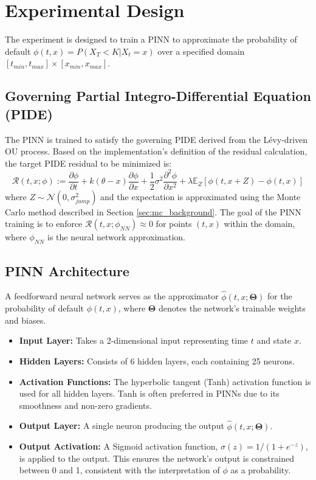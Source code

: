 \documentclass[11pt,twoside,openright]{report}
\begin{document}
\section{Experimental Design}
\label{sec:exp_design}

The experiment is designed to train a PINN to approximate the probability of default $\phi(t, x) = P(X_T < K | X_t = x)$ over a specified domain $[t_{min}, t_{max}] \times [x_{min}, x_{max}]$.

\subsection{Governing Partial Integro-Differential Equation (PIDE)}
\label{subsec:pide}

The PINN is trained to satisfy the governing PIDE derived from the Lévy-driven OU process. Based on the implementation's definition of the residual calculation, the target PIDE residual to be minimized is:
$$
\mathcal{R}(t, x; \phi) := \frac{\partial \phi}{\partial t} + k(\theta - x)\frac{\partial \phi}{\partial x} + \frac{1}{2}\sigma^2 \frac{\partial^2 \phi}{\partial x^2} + \lambda \mathbb{E}_Z[\phi(t, x+Z) - \phi(t, x)]
$$
where $Z \sim \mathcal{N}(0, \sigma_{jump}^2)$ and the expectation is approximated using the Monte Carlo method described in Section \ref{sec:mc_background}. The goal of the PINN training is to enforce $\mathcal{R}(t, x; \phi_{NN}) \approx 0$ for points $(t, x)$ within the domain, where $\phi_{NN}$ is the neural network approximation.

\subsection{PINN Architecture}
\label{subsec:pinn_arch}

A feedforward neural network serves as the approximator $\hat{\phi}(t, x; \mathbf{\Theta})$ for the probability of default $\phi(t, x)$, where $\mathbf{\Theta}$ denotes the network's trainable weights and biases.


\begin{itemize}
    \item \textbf{Input Layer:} Takes a 2-dimensional input representing time $t$ and state $x$.
    \item \textbf{Hidden Layers:} Consists of 6 hidden layers, each containing 25 neurons.
    \item \textbf{Activation Functions:} The hyperbolic tangent (Tanh) activation function is used for all hidden layers. Tanh is often preferred in PINNs due to its smoothness and non-zero gradients.
    \item \textbf{Output Layer:} A single neuron producing the output $\hat{\phi}(t, x; \mathbf{\Theta})$.
    \item \textbf{Output Activation:} A Sigmoid activation function, $\sigma(z) = 1 / (1 + e^{-z})$, is applied to the output. This ensures the network's output is constrained between 0 and 1, consistent with the interpretation of $\phi$ as a probability.
\end{itemize}
\end{document}
